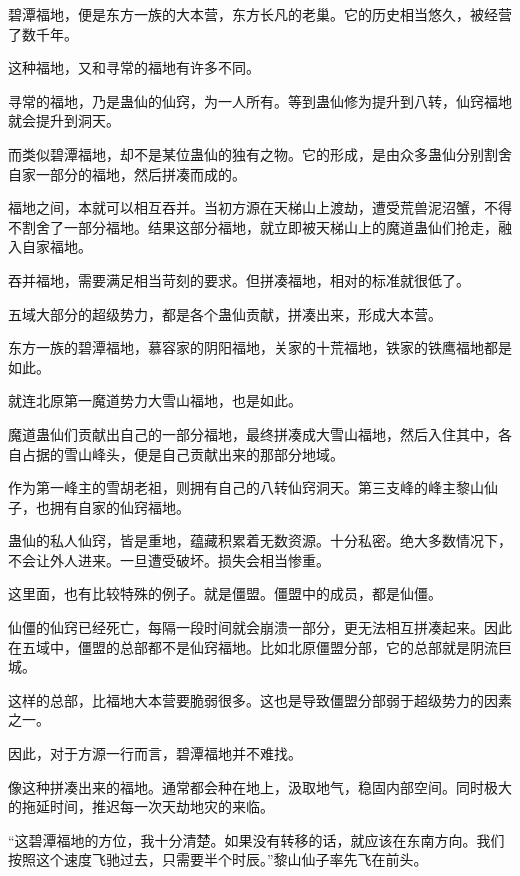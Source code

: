 
\begin{this_body}

碧潭福地，便是东方一族的大本营，东方长凡的老巢。它的历史相当悠久，被经营了数千年。

这种福地，又和寻常的福地有许多不同。

寻常的福地，乃是蛊仙的仙窍，为一人所有。等到蛊仙修为提升到八转，仙窍福地就会提升到洞天。

而类似碧潭福地，却不是某位蛊仙的独有之物。它的形成，是由众多蛊仙分别割舍自家一部分的福地，然后拼凑而成的。

福地之间，本就可以相互吞并。当初方源在天梯山上渡劫，遭受荒兽泥沼蟹，不得不割舍了一部分福地。结果这部分福地，就立即被天梯山上的魔道蛊仙们抢走，融入自家福地。

吞并福地，需要满足相当苛刻的要求。但拼凑福地，相对的标准就很低了。

五域大部分的超级势力，都是各个蛊仙贡献，拼凑出来，形成大本营。

东方一族的碧潭福地，慕容家的阴阳福地，关家的十荒福地，铁家的铁鹰福地都是如此。

就连北原第一魔道势力大雪山福地，也是如此。

魔道蛊仙们贡献出自己的一部分福地，最终拼凑成大雪山福地，然后入住其中，各自占据的雪山峰头，便是自己贡献出来的那部分地域。

作为第一峰主的雪胡老祖，则拥有自己的八转仙窍洞天。第三支峰的峰主黎山仙子，也拥有自家的仙窍福地。

蛊仙的私人仙窍，皆是重地，蕴藏积累着无数资源。十分私密。绝大多数情况下，不会让外人进来。一旦遭受破坏。损失会相当惨重。

这里面，也有比较特殊的例子。就是僵盟。僵盟中的成员，都是仙僵。

仙僵的仙窍已经死亡，每隔一段时间就会崩溃一部分，更无法相互拼凑起来。因此在五域中，僵盟的总部都不是仙窍福地。比如北原僵盟分部，它的总部就是阴流巨城。

这样的总部，比福地大本营要脆弱很多。这也是导致僵盟分部弱于超级势力的因素之一。

因此，对于方源一行而言，碧潭福地并不难找。

像这种拼凑出来的福地。通常都会种在地上，汲取地气，稳固内部空间。同时极大的拖延时间，推迟每一次天劫地灾的来临。

“这碧潭福地的方位，我十分清楚。如果没有转移的话，就应该在东南方向。我们按照这个速度飞驰过去，只需要半个时辰。”黎山仙子率先飞在前头。


\end{this_body}
